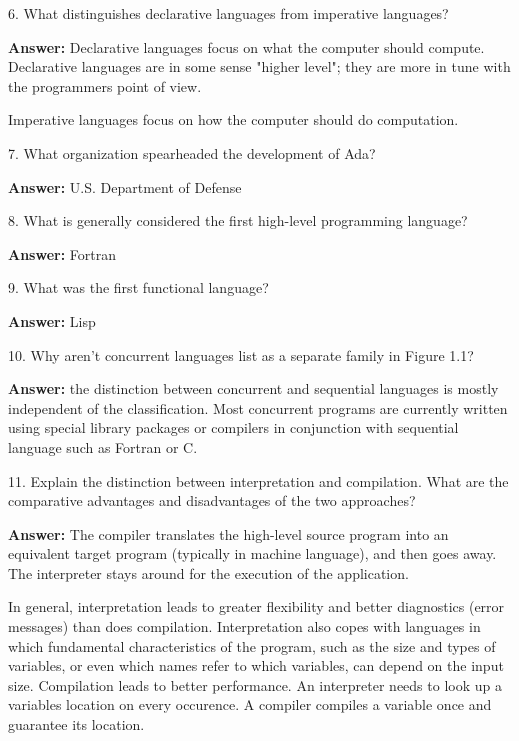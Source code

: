 6. What distinguishes declarative languages from imperative languages?

\vskip 3mm
{\bf Answer:} Declarative languages focus on what the computer should compute. Declarative languages are in some sense "higher level"; they are more in tune with the programmers point of view.

\vskip 2mm
Imperative languages focus on how the computer should do computation.

\filbreak
\vskip 1cm

7. What organization spearheaded the development of Ada?

\vskip 1mm
{\bf Answer:} U.S. Department of Defense

\filbreak
\vskip 1cm

8. What is generally considered the first high-level programming language?

\vskip 3mm
{\bf Answer:} Fortran

\filbreak
\vskip 1cm

9. What was the first functional language?

\vskip 3mm
{\bf Answer:} Lisp

\filbreak
\vskip 1cm

10. Why aren't concurrent languages list as a separate family in Figure 1.1?

\vskip 3mm
{\bf Answer:} the distinction between concurrent and sequential languages is mostly independent of the classification. Most concurrent programs are currently written using special library packages or compilers in conjunction with sequential language such as Fortran or C.


\filbreak
\vskip 1cm

11. Explain the distinction between interpretation and compilation. What are the comparative advantages and disadvantages of the two approaches?

\vskip 3mm
{\bf Answer:} The compiler translates the high-level source program into an equivalent target program (typically in machine language), and then goes away. The interpreter stays around for the execution of the application.

\vskip 2mm
In general, interpretation leads to greater flexibility and better diagnostics (error messages) than does compilation. Interpretation also copes with languages in which fundamental characteristics of the program, such as the size and types of variables, or even which names refer to which variables, can depend on the input size. Compilation leads to better performance. An interpreter needs to look up a variables location on every occurence. A compiler compiles a variable once and guarantee its location.


